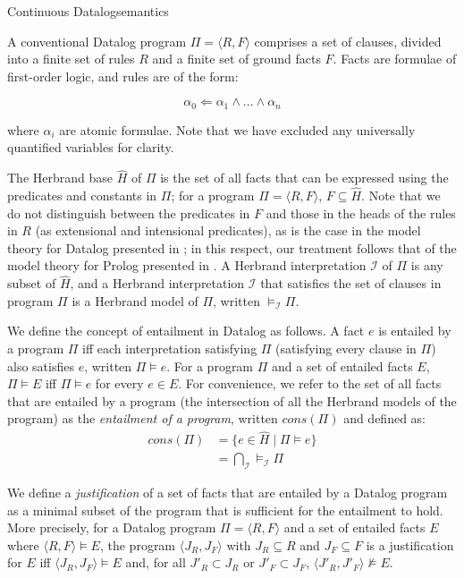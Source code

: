 \begin{nestedsection}{Continuous Datalog}{semantics}
\begin{definition}[Datalog]
A conventional Datalog program $\Pi = \langle R, F\rangle$ comprises a
set of clauses, divided into a finite set of rules $R$ and a finite
set of ground facts $F$. Facts are formulae of first-order logic, and
rules are of the form:

\[ \alpha_0 \Leftarrow \alpha_1 \land \ldots \land \alpha_n \]

\noindent where $\alpha_i$ are atomic formulae. Note that we have excluded any
universally quantified variables for clarity.

The Herbrand base $\hat{H}$ of $\Pi$ is the set of all facts that can
be expressed using the predicates and constants in $\Pi$; for a program $\Pi =
\langle R, F \rangle$, $F \subseteq \hat{H}$. Note that we do not
distinguish between the predicates in $F$ and those in the heads of
the rules in $R$ (as extensional and intensional predicates), as is
the case in the model theory for Datalog presented in
\cite{datalog-basics}; in this respect, our treatment follows that of
the model theory for Prolog presented in \cite{prolog-semantics}. A
Herbrand interpretation $\mathcal{I}$ of $\Pi$ is any subset of
$\hat{H}$, and a Herbrand interpretation $\mathcal{I}$ that satisfies
the set of clauses in program $\Pi$ is a Herbrand model of $\Pi$,
written $\models_{\mathcal{I}} \Pi$.

We define the concept of entailment in Datalog as follows. A fact $e$
is entailed by a program $\Pi$ iff each interpretation satisfying
$\Pi$ (satisfying every clause in $\Pi$) also satisfies $e$, written
$\Pi \models e$. For a program $\Pi$ and a set of entailed facts
$E$, $\Pi \models E$ iff $\Pi \models e$ for every $e \in E$. For
convenience, we refer to the set of all facts that are entailed by a
program (the intersection of all the Herbrand models of the program)
as the {\em entailment of a program}, written $cons(\Pi)$ and defined
as:
\begin{align*}
  cons(\Pi) &= \{ e \in \hat{H} \mid \Pi \models e \} \\
  &= \bigcap_\mathcal{I} \models_\mathcal{I} \Pi
\end{align*}
\end{definition}

\begin{definition}[Justification]

We define a {\em justification} of a set of facts that are entailed by
a Datalog program as a minimal subset of the program that is
sufficient for the entailment to hold. More precisely, for a Datalog
program $\Pi = \langle R, F \rangle$ and a set of entailed facts $E$
where $\langle R, F \rangle \models E$, the program $\langle J_R, J_F
\rangle$ with $J_R \subseteq R$ and $J_F \subseteq F$ is a
justification for $E$ iff $\langle J_R, J_F \rangle \models E$ and,
for all $J'_R \subset J_R$ or $J'_F \subset J_F$, $\langle J'_R, J'_F
\rangle \not\models E$.


\end{definition}
\end{nestedsection}
